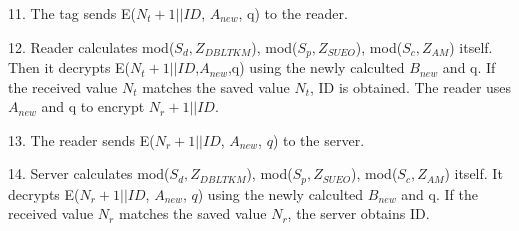 {    11. The tag sends E($N_t+1||ID$, $A_{new}$, q) to the reader.
    
    12. Reader calculates mod($S_d, Z_{DBLTKM}$), mod($S_p, Z_{SUEO}$), mod($S_c, Z_{AM}$) itself. Then it decrypts E($N_t+1||ID$,$A_{new}$,q) 
    using the newly calculted $B_{new}$ and q. If the received value $N_t$ matches the saved value $N_t$, ID is obtained. The reader uses $A_{new}$ and q to encrypt $N_r+1||ID$. 

    13. The reader sends E($N_r+1||ID$, $A_{new}$, $q$) to the server.

    14. Server calculates mod($S_d, Z_{DBLTKM}$), mod($S_p, Z_{SUEO}$), mod($S_c, Z_{AM}$) itself. It decrypts E($N_r+1||ID$, $A_{new}$, $q$) using the newly calculted $B_{new}$ and q. If the received value $N_r$ 
    matches the saved value $N_r$, the server obtains ID.
    
}


